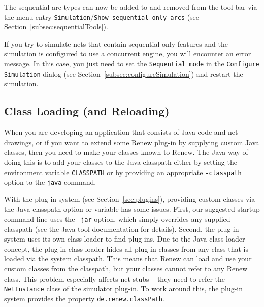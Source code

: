 The sequential arc types can now be added to and removed from the
tool bar via the menu entry
\texttt{Simulation}/\texttt{Show sequential-only arcs}
(see Section~\ref{subsec:sequentialTools}).

If you try to simulate nets that contain sequential-only features
and the simulation is configured to use a concurrent engine, you
will encounter an error message.
In this case, you just need to set the \texttt{Sequential mode}
in the \texttt{Configure Simulation} dialog (see
Section~\ref{subsec:configureSimulation}) and restart the
simulation.

%
%

\subsection{Class Loading (and Reloading)}
\label{subsec:classLoading}\label{subsec:classReinit}

When you are developing an application that consists
of Java code and net drawings, or if you want to extend some Renew
plug-in by supplying custom Java classes, then you need to make your
classes known to Renew.
The Java way of doing this is to add your classes to the Java
classpath either by setting the environment variable
\texttt{CLASSPATH} or by providing an appropriate \texttt{-classpath}
option to the \texttt{java} command.

With the plug-in system (see
Section~\ref{sec:plugins}), providing custom classes via the
Java classpath option or variable has some issues.
First, our suggested startup command line uses the \texttt{-jar}
option, which simply overrides any supplied classpath (see the Java
tool documentation for details).
Second, the plug-in system uses its own class loader to find plug-ins.
Due to the Java class loader concept, the plug-in class loader hides
all plug-in classes from any class that is loaded via the system
classpath.
This means that Renew can load and use your custom classes from the
classpath, but your classes cannot refer to any Renew class.
This problem especially affects net stubs -- they need to refer
the \texttt{NetInstance} class of the simulator plug-in.
To work around this, the plug-in system provides the property
\texttt{de.renew.classPath}.

